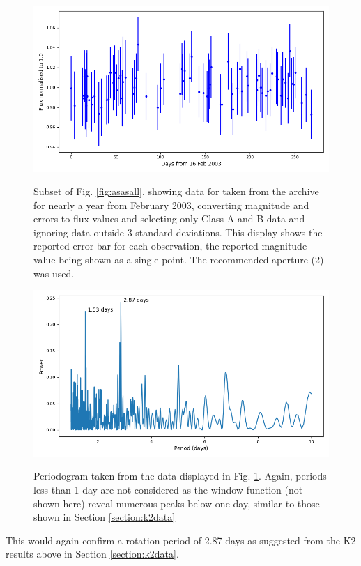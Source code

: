 \begin{figure}[!htbp]
\begin{center}
\includegraphics[scale=0.40]{asas/images/asaslcurve.png} \\
\vspace{-.5cm}
\end{center}   
\caption{Subset of Fig. \ref{fig:asasall}, showing {\asas} data for {\ross}
taken from the archive for nearly a year from February 2003, converting
magnitude and errors to flux values and selecting only Class A and B data and
ignoring data outside 3 standard deviations.
This display shows the reported error bar for each observation, the reported magnitude
value being shown as a single point. The
recommended aperture (2) was used.}\protect\label{fig:asaslcurve}
\end{figure}

\begin{figure}[!htbp]
\begin{center}
\includegraphics[scale=0.40]{asas/images/asaspgram.png} \\
\vspace{-.5cm}
\end{center}   
\caption{Periodogram taken from the data displayed in Fig.
\ref{fig:asaslcurve}. Again, periods less than 1
day are not considered as the window function (not shown here) reveal numerous
peaks below one day, similar to those shown in Section
\ref{section:k2data}}\protect\label{fig:asaspgram}
\end{figure}

This would again confirm a rotation period of 2.87 days as suggested from the K2
results above in Section \ref{section:k2data}.

